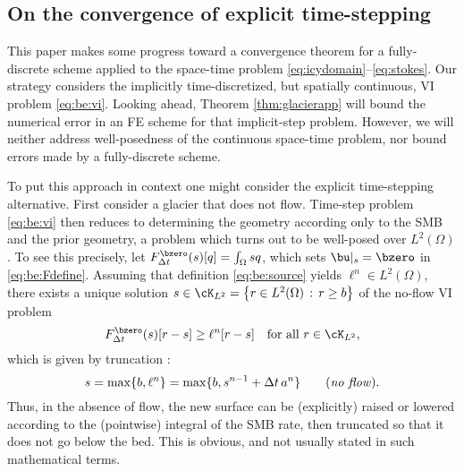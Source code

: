 \subsection{On the convergence of explicit time-stepping} \label{subsec:explicit}  This paper makes some progress toward a convergence theorem for a fully-discrete scheme applied to the space-time problem \eqref{eq:icydomain}--\eqref{eq:stokes}.  Our strategy considers the implicitly time-discretized, but spatially continuous, VI problem \eqref{eq:be:vi}.  Looking ahead, Theorem \ref{thm:glacierapp} will bound the numerical error in an FE scheme for that implicit-step problem.  However, we will neither address well-posedness of the continuous space-time problem, nor bound errors made by a fully-discrete scheme.

To put this approach in context one might consider the explicit time-stepping alternative.  First consider a glacier that does not flow.  Time-step problem \eqref{eq:be:vi} then reduces to determining the geometry according only to the SMB and the prior geometry, a problem which turns out to be well-posed over $L^2(\Omega)$.  To see this precisely, let $F^{\bzero}_{\Delta t}(s)[q] = \int_\Omega sq$, which sets $\bu|_s=\bzero$ in \eqref{eq:be:Fdefine}.  Assuming that definition \eqref{eq:be:source} yields $\ell^n \in L^2(\Omega)$, there exists a unique solution $s \in \cK_{L^2} = \left\{r\in L^2(\Omega)\,:\,r \ge b\right\}$ of the no-flow VI problem
\begin{equation}
F^{\bzero}_{\Delta t}(s)[r-s] \ge \ell^n[r-s] \quad \text{for all } r \in \cK_{L^2}, \label{eq:explicit:noflow}
\end{equation}
which is given by truncation \cite[section II.3]{KinderlehrerStampacchia1980}:
\begin{equation}
s = \max\{b, \ell^n\} = \max\{b, s^{n-1} + \Delta t\,a^n\} \qquad (\text{\emph{no flow}}).
\end{equation}
Thus, in the absence of flow, the new surface can be (explicitly) raised or lowered according to the (pointwise) integral of the SMB rate, then truncated so that it does not go below the bed.  This is obvious, and not usually stated in such mathematical terms.


